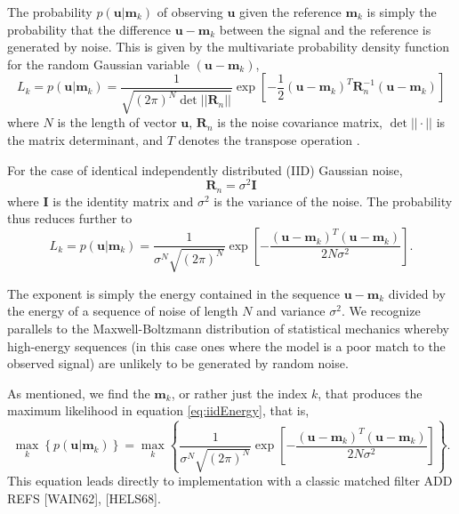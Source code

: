 The probability $p(\mathbf{u}|\mathbf{m}_k)$ of observing $\mathbf{u}$ given the reference $\mathbf{m}_k$ is simply the probability that the difference $\mathbf{u}-\mathbf{m}_k$ between the signal and the reference is generated by noise. This is given by the multivariate probability density function for the random Gaussian variable $(\mathbf{u}-\mathbf{m}_k)$, 
\begin{equation}\label{eq:Main}
L_k = p(\mathbf{u}|\mathbf{m}_k) = \frac{1}{  \sqrt{ (2\pi)^N \det || \mathbf{R}_n||} } \exp\left[ -\frac{1}{2}  (\mathbf{u}-\mathbf{m}_k)^T \mathbf{R}_n^{-1} (\mathbf{u}-\mathbf{m}_k) \right]
\end{equation}
where $N$ is the length of vector $\mathbf{u}$, $\mathbf{R}_n$ is the noise covariance matrix, $\det||{\cdot}||$ is the matrix determinant, and $T$ denotes the transpose operation  \citep{helstrom_statistical_1968, wainstein_extraction_1962}.

For the case of identical independently distributed (IID) Gaussian noise, 
\begin{equation}
\mathbf{R}_n=\sigma^2 \mathbf{I}
\end{equation}
where $\mathbf{I}$ is the identity matrix and $\sigma^2$ is the variance of the noise. The probability thus reduces further to
\begin{equation}\label{eq:iidEnergy}
L_k = p(\mathbf{u}|\mathbf{m}_k) = \frac{1}{  \sigma^N \sqrt{ (2\pi)^N}   } \exp\left[ -\frac{(\mathbf{u}-\mathbf{m}_k)^T(\mathbf{u}-\mathbf{m}_k)} {2 N \sigma^2 } \right].
\end{equation}

The exponent is simply the energy contained in the sequence $\mathbf{u}-\mathbf{m}_k$ divided by the
energy of a sequence of noise of length $N$ and variance $\sigma^2$. We recognize parallels to the Maxwell-Boltzmann distribution of statistical mechanics \citep{reif_fundamentals_1965} whereby high-energy sequences (in this case ones where the model is a poor match to the observed signal) are unlikely to be generated by random noise.  

As mentioned, we find the $\mathbf{m}_k$, or rather just the index $k$, that produces the maximum likelihood in equation \ref{eq:iidEnergy}, that is,
\begin{equation}
\max_k   \left\{ p(\mathbf{u}|\mathbf{m}_k) \right\} =  \max_k  \left\{ \frac{1}{   \sigma^N\sqrt{ (2\pi)^N}  } \exp\left[ -\frac{(\mathbf{u}-\mathbf{m}_k)^T(\mathbf{u}-\mathbf{m}_k)} {2 N \sigma^2 } \right] \right\}. 
\end{equation}
This equation leads directly to implementation with a classic matched filter ADD REFS [WAIN62], [HELS68]. 

